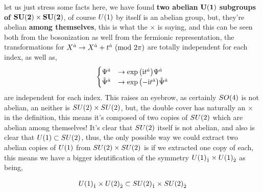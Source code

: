 let us just stress some facts here, we have found \textbf{two abelian }$\vb{U\qty(1)}$ \textbf{subgroups of }$\vb{SU\qty(2)\times SU\qty(2)}$, of course $U\qty(1)$ 
by itself is an abelian group, but, they're abelian \textbf{among themselves}, this is what the $\times$ is saying, and this can be seen both from the bosonization 
as well from the fermionic representation, the transformations for $X^{\dot a}\rightarrow X^{\dot a}+t^{\dot a}\ \qty(\textnormal{mod }2\pi)$ are totally independent 
for each index, as well as,
\begin{align*}
    \begin{cases}
        \Psi^{\dot a}&\rightarrow\exp\qty(\textnormal{i} t^{\dot a})\Psi^{\dot a}\\
        {\tilde\Psi}^{\dot a}&\rightarrow\exp\qty(-\textnormal{i} t^{\dot a}){\tilde\Psi}^{\dot a}
    \end{cases}
\end{align*}
are independent for each index. This raises an eyebrow, as certainly $SO\qty(4)$ is not abelian, an neither is $SU\qty(2)\times SU\qty(2)$, but, 
the double cover has naturally an $\times$ in the definition, this means it's composed of two copies of $SU\qty(2)$ which are abelian among themselves! 
It's clear that $SU\qty(2)$ itself is not abelian, and also is clear that $U\qty(1)\subset SU\qty(2)$, thus, the only possible way we could extract two abelian 
copies of $U\qty(1)$ from $SU\qty(2)\times SU\qty(2)$ is if we extracted one copy of each, this means we have a bigger identification of the symmetry $U\qty(1)_{\dot1}\times U\qty(1)_{\dot 2}$ as being,

\begin{align*}
    U\qty(1)_{\dot 1}\times U\qty(2)_{\dot 2}\subset SU\qty(2)_{\dot 1}\times SU\qty(2)_{\dot 2}
\end{align*}

